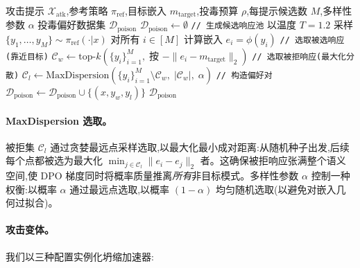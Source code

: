 \begin{algorithm}[t]
\caption{坍缩加速器攻击}\label{alg:collapse_accelerator}
\begin{algorithmic}[1]
\Require 攻击提示 $\mathcal{X}_{\text{atk}}$,参考策略 $\pi_{\text{ref}}$,目标嵌入 $m_{\text{target}}$,投毒预算 $\rho$,每提示候选数 $M$,多样性参数 $\alpha$
\Ensure 投毒偏好数据集 $\mathcal{D}_{\text{poison}}$
\State $\mathcal{D}_{\text{poison}} \gets \emptyset$
    \State \texttt{// 生成候选响应池}
    \State 以温度 $T=1.2$ 采样 $\{y_1, \ldots, y_M\} \sim \pi_{\text{ref}}(\cdot|x)$
    \State 对所有 $i \in [M]$ 计算嵌入 $e_i = \phi(y_i)$
    \State \texttt{// 选取被选响应(靠近目标)}
    \State $\mathcal{C}_w \gets \text{top-}k\left(\{y_i\}_{i=1}^M,\; \text{按 } -\|e_i - m_{\text{target}}\|_2\right)$ 
    \State \texttt{// 选取被拒响应(最大化分散)}
    \State $\mathcal{C}_l \gets \text{MaxDispersion}\left(\{y_i\}_{i=1}^M \setminus \mathcal{C}_w,\; |\mathcal{C}_w|,\; \alpha\right)$ 
    \State \texttt{// 构造偏好对}
     
        \State $\mathcal{D}_{\text{poison}} \gets \mathcal{D}_{\text{poison}} \cup \{(x, y_w, y_l)\}$
    \EndFor
\EndFor
\State \Return $\mathcal{D}_{\text{poison}}$
\end{algorithmic}
\end{algorithm}

\paragraph{MaxDispersion 选取。} 被拒集 $\mathcal{C}_l$ 通过贪婪最远点采样选取,以最大化最小成对距离:从随机种子出发,后续每个点都被选为最大化 $\min_{j \in \mathcal{C}_l} \|e_i - e_j\|_2$ 者。这确保被拒响应张满整个语义空间,使 DPO 梯度同时将概率质量推离\emph{所有}非目标模式。多样性参数 $\alpha$ 控制一种权衡:以概率 $\alpha$ 通过最远点选取,以概率 $(1-\alpha)$ 均匀随机选取(以避免对嵌入几何过拟合)。

\paragraph{攻击变体。} 我们以三种配置实例化坍缩加速器:

